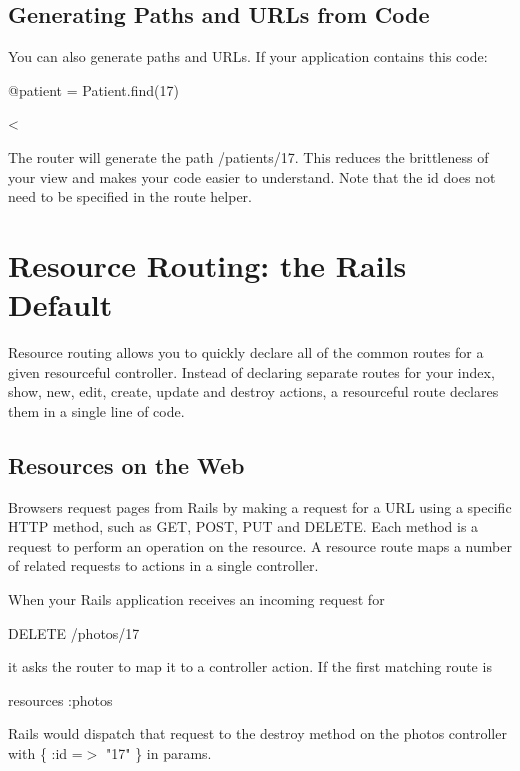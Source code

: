 \documentclass[10pt]{book}
\newenvironment{code}{%
  \scriptsize
    \verbatim
}{%
    \endverbatim
    \newline
}
\begin{document}
\subsection{ Generating Paths and URLs from Code}

You can also generate paths and URLs. If your application contains this code:
\begin{code}
@patient = Patient.find(17)
\end{code}
\begin{code}
<%
\end{code}

The router will generate the path /patients/17. This reduces  the brittleness of your view and makes your code easier to understand.  Note that the id does not need to be specified in the route helper.

\section{ Resource Routing: the Rails Default}

Resource routing allows you to quickly declare all of the common  routes for a given resourceful controller. Instead of declaring separate  routes for your index, show, new, edit, create, update and destroy actions, a resourceful route declares them in a single line of code.

\subsection{ Resources on the Web}

Browsers request pages from Rails by making a request for a URL using a specific HTTP method, such as GET, POST, PUT and DELETE.  Each method is a request to perform an operation on the resource. A  resource route maps a number of related requests to actions in a single  controller.

When your Rails application receives an incoming request for
\begin{code}
DELETE /photos/17
\end{code}

it asks the router to map it to a controller action. If the first matching route is
\begin{code}
resources :photos
\end{code}

Rails would dispatch that request to the destroy method on the photos controller with \{ :id =$>$ "17" \} in params.
\end{document}
